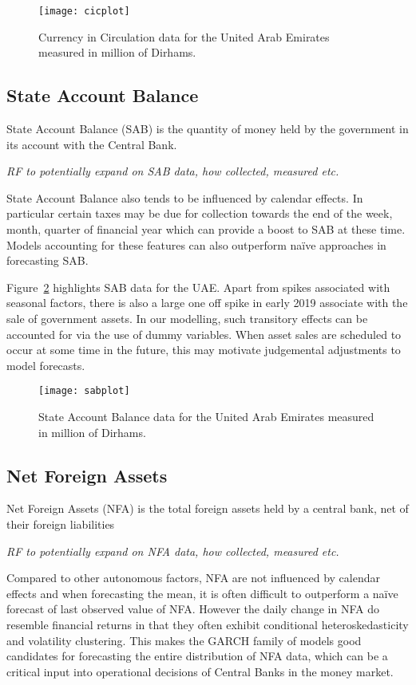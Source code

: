 \begin{figure}[!h] \centering \texttt{[image: cicplot]}
    \caption{Currency  in  Circulation  data  for  the  United  Arab  Emirates
measured in million of Dirhams.}
    \label{fig:cicdata}
\end{figure}

\subsection{State Account Balance}

State Account Balance (SAB) is the quantity of money held by the government in
its account with the Central Bank.

\textit{\color{blue}  RF to  potentially expand  on SAB  data, how  collected,
measured etc.}

State Account  Balance also  tends to  be influenced  by calendar  effects. In
particular certain  taxes may  be due  for collection towards  the end  of the
week, month,  quarter of financial  year which can provide  a boost to  SAB at
these time. Models  accounting for these features can  also outperform na\"ive
approaches in forecasting SAB.

Figure~\ref{fig:sabdata} highlights  SAB data for  the UAE. Apart  from spikes
associated with seasonal factors, there is also a large one off spike in early
2019 associate  with the sale  of government  assets.  In our  modelling, such
transitory effects can  be accounted for via the use  of dummy variables. When
asset  sales are  scheduled to  occur at  some time  in the  future, this  may
motivate judgemental adjustments to model forecasts.

\begin{figure}[!h] \centering \texttt{[image: sabplot]}
    \caption{State Account Balance data for  the United Arab Emirates measured
in million of Dirhams.}
    \label{fig:sabdata}
\end{figure}

\subsection{Net Foreign Assets}

Net Foreign Assets (NFA)  is the total foreign assets held  by a central bank,
net of their foreign liabilities

\textit{\color{blue}  RF to  potentially expand  on NFA  data, how  collected,
measured etc.}

Compared  to other  autonomous factors,  NFA  are not  influenced by  calendar
effects and when  forecasting the mean, it is often  difficult to outperform a
na\"ive forecast  of last observed value  of NFA. However the  daily change in
NFA  do resemble  financial returns  in  that they  often exhibit  conditional
heteroskedasticity and volatility  clustering. This makes the  GARCH family of
models good  candidates for forecasting  the entire distribution of  NFA data,
which can be  a critical input into operational decisions  of Central Banks in
the money market.

